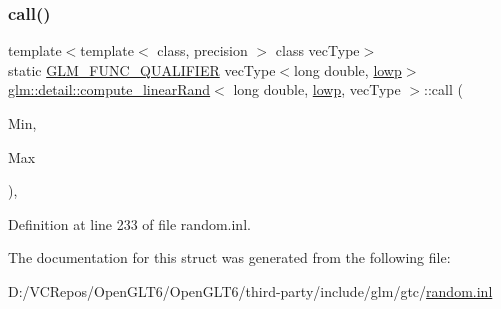\subsubsection{\texorpdfstring{call()}{call()}}
{\footnotesize\ttfamily template$<$template$<$ class, precision $>$ class vec\+Type$>$ \\
static \mbox{\hyperlink{setup_8hpp_a33fdea6f91c5f834105f7415e2a64407}{G\+L\+M\+\_\+\+F\+U\+N\+C\+\_\+\+Q\+U\+A\+L\+I\+F\+I\+ER}} vec\+Type$<$long double, \mbox{\hyperlink{namespaceglm_a0f04f086094c747d227af4425893f545ae161af3fc695e696ce3bf69f7332bc2d}{lowp}}$>$ \mbox{\hyperlink{structglm_1_1detail_1_1compute__linear_rand}{glm\+::detail\+::compute\+\_\+linear\+Rand}}$<$ long double, \mbox{\hyperlink{namespaceglm_a0f04f086094c747d227af4425893f545ae161af3fc695e696ce3bf69f7332bc2d}{lowp}}, vec\+Type $>$\+::call (\begin{DoxyParamCaption}\item[{vec\+Type$<$ long double, \mbox{\hyperlink{namespaceglm_a0f04f086094c747d227af4425893f545ae161af3fc695e696ce3bf69f7332bc2d}{lowp}} $>$ const \&}]{Min,  }\item[{vec\+Type$<$ long double, \mbox{\hyperlink{namespaceglm_a0f04f086094c747d227af4425893f545ae161af3fc695e696ce3bf69f7332bc2d}{lowp}} $>$ const \&}]{Max }\end{DoxyParamCaption})\hspace{0.3cm}{\ttfamily [inline]}, {\ttfamily [static]}}



Definition at line 233 of file random.\+inl.



The documentation for this struct was generated from the following file\+:\begin{DoxyCompactItemize}
\item 
D\+:/\+V\+C\+Repos/\+Open\+G\+L\+T6/\+Open\+G\+L\+T6/third-\/party/include/glm/gtc/\mbox{\hyperlink{random_8inl}{random.\+inl}}\end{DoxyCompactItemize}
